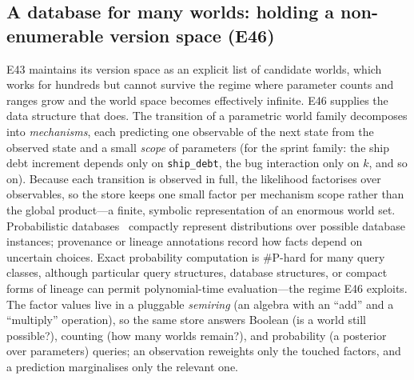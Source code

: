\documentclass[11pt]{article}
\begin{document}
\subsection{A database for many worlds: holding a non-enumerable version space (E46)}\label{sec:many-worlds}
E43 maintains its version space as an explicit list of candidate worlds, which
works for hundreds but cannot survive the regime where parameter counts and
ranges grow and the world space becomes effectively infinite. E46 supplies the
data structure that does. The transition of a parametric world family decomposes
into \emph{mechanisms}, each predicting one observable of the next state from the
observed state and a small \emph{scope} of parameters (for the sprint family:
the ship debt increment depends only on \texttt{ship\_debt}, the bug interaction
only on $k$, and so on). Because each transition is observed in full, the
likelihood factorises over observables, so the store keeps one small factor per
mechanism scope rather than the global product---a finite, symbolic
representation of an enormous world set. Probabilistic
databases~\cite{suciu2011probabilistic,green2007provenance} compactly represent distributions over possible database
instances; provenance or lineage annotations record how facts depend on uncertain
choices. Exact probability computation is \#P-hard for many query classes, although
particular query structures, database structures, or compact forms of lineage can
permit polynomial-time evaluation---the regime E46 exploits. The factor values
live in a pluggable \emph{semiring} (an algebra with an
``add'' and a ``multiply'' operation), so the same store answers Boolean (is a world still possible?), counting
(how many worlds remain?), and probability (a posterior over parameters)
queries; an observation reweights only the touched factors, and a prediction
marginalises only the relevant one.
\end{document}
